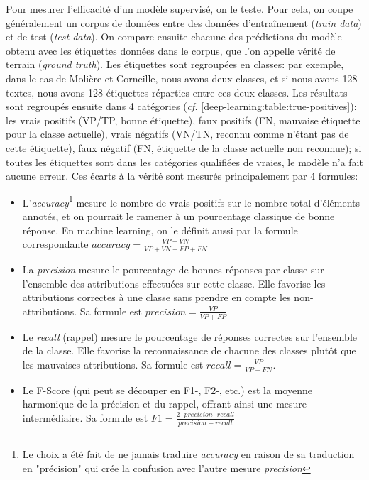 Pour mesurer l'efficacité d'un modèle supervisé, on le teste. Pour cela, on coupe généralement un corpus de données entre des données d'entraînement (\textit{train data}) et de test (\textit{test data}). On compare ensuite chacune des prédictions du modèle obtenu avec les étiquettes données dans le corpus, que l'on appelle vérité de terrain (\textit{ground truth}). Les étiquettes sont regroupées en classes: par exemple, dans le cas de Molière et Corneille, nous avons deux classes, et si nous avons 128 textes, nous avons 128 étiquettes réparties entre ces deux classes. Les résultats sont regroupés ensuite dans 4 catégories (\textit{cf.} \ref{deep-learning:table:true-positives}): les vrais positifs (VP/TP, bonne étiquette), faux positifs (FN, mauvaise étiquette pour la classe actuelle), vrais négatifs (VN/TN, reconnu comme n'étant pas de cette étiquette), faux négatif (FN, étiquette de la classe actuelle non reconnue); si toutes les étiquettes sont dans les catégories qualifiées de vraies, le modèle n'a fait aucune erreur. Ces écarts à la vérité sont mesurés principalement par 4 formules:
\begin{itemize}
    \item L'\textit{accuracy}\footnote{Le choix a été fait de ne jamais traduire \textit{accuracy} en raison de sa traduction en "précision" qui crée la confusion avec l'autre mesure \textit{precision}} mesure le nombre de vrais positifs sur le nombre total d'éléments annotés, et on pourrait le ramener à un pourcentage classique de bonne réponse. En machine learning, on le définit aussi par la formule correspondante $accuracy = \frac{VP + VN}{VP + VN + FP + FN}$
    \item La \textit{precision} mesure le pourcentage de bonnes réponses par classe sur l'ensemble des attributions effectuées sur cette classe. Elle favorise les attributions correctes à une classe sans prendre en compte les non-attributions. Sa formule est $precision = \frac{VP}{VP + FP}$
    \item Le \textit{recall} (rappel) mesure le pourcentage de réponses correctes sur l'ensemble de la classe. Elle favorise la reconnaissance de chacune des classes plutôt que les mauvaises attributions. Sa formule est $recall = \frac{VP}{VP+FN}$.
    \item Le F-Score (qui peut se découper en F1-, F2-, etc.) est la moyenne harmonique de la précision et du rappel, offrant ainsi une mesure intermédiaire. Sa formule est $F1 = \frac{2 \cdot precision\cdot recall}{precision+ recall}$
\end{itemize}{}

